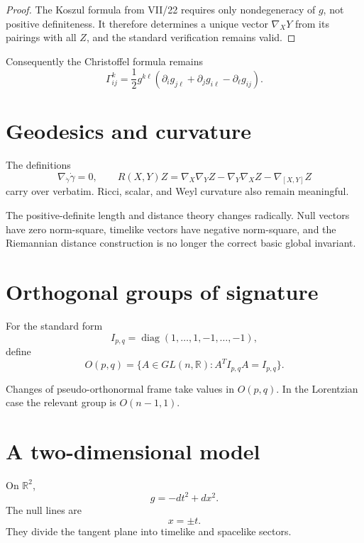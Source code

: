 \begin{proof}
The Koszul formula from VII/22 requires only nondegeneracy of \(g\), not positive
definiteness.  It therefore determines a unique vector \(\nabla_XY\) from its
pairings with all \(Z\), and the standard verification remains valid.
\end{proof}

Consequently the Christoffel formula remains
\[
\Gamma^k_{ij}
=
\frac12g^{k\ell}
\left(
\partial_i g_{j\ell}
+\partial_j g_{i\ell}
-\partial_\ell g_{ij}
\right).
\]

\section{Geodesics and curvature}

The definitions
\[
\nabla_{\dot\gamma}\dot\gamma=0,
\qquad
R(X,Y)Z
=
\nabla_X\nabla_YZ-\nabla_Y\nabla_XZ-\nabla_{[X,Y]}Z
\]
carry over verbatim.  Ricci, scalar, and Weyl curvature also remain meaningful.

\begin{warning}\label{warn:vii29-distance}
The positive-definite length and distance theory changes radically.  Null vectors
have zero norm-square, timelike vectors have negative norm-square, and the
Riemannian distance construction is no longer the correct basic global invariant.
\end{warning}

\section{Orthogonal groups of signature}

For the standard form
\[
I_{p,q}=\operatorname{diag}(1,\dots,1,-1,\dots,-1),
\]
define
\[
O(p,q)
=
\{A\in GL(n,\mathbb R):A^TI_{p,q}A=I_{p,q}\}.
\]

\begin{proposition}\label{prop:vii29-opq}
Changes of pseudo-orthonormal frame take values in \(O(p,q)\).  In the Lorentzian
case the relevant group is \(O(n-1,1)\).
\end{proposition}

\section{A two-dimensional model}

\begin{example}\label{ex:vii29-plane}
On \(\mathbb R^2\),
\[
g=-dt^2+dx^2.
\]
The null lines are
\[
x=\pm t.
\]
They divide the tangent plane into timelike and spacelike sectors.
\end{example}

